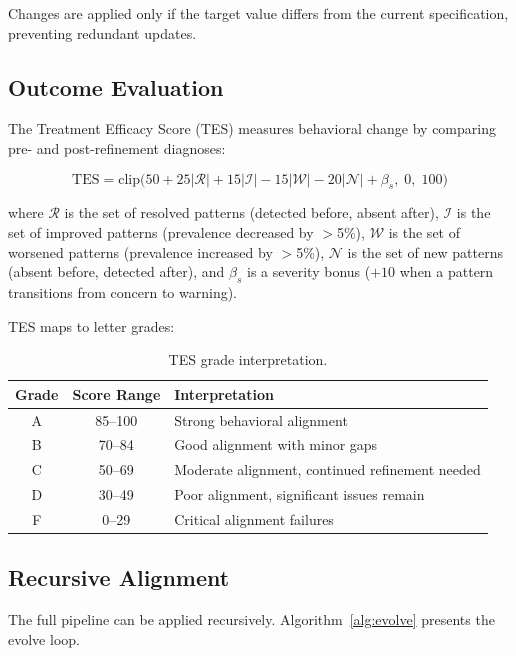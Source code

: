 \documentclass[11pt,a4paper]{article}
\begin{document}
Changes are applied only if the target value differs from the current specification, preventing redundant updates.

\subsection{Outcome Evaluation}

The Treatment Efficacy Score (TES) measures behavioral change by comparing pre- and post-refinement diagnoses:

\begin{equation}
\text{TES} = \text{clip}\Big(50 + 25|\mathcal{R}| + 15|\mathcal{I}| - 15|\mathcal{W}| - 20|\mathcal{N}| + \beta_s, \; 0, \; 100\Big)
\label{eq:tes}
\end{equation}

\noindent where $\mathcal{R}$ is the set of resolved patterns (detected before, absent after), $\mathcal{I}$ is the set of improved patterns (prevalence decreased by $>$5\%), $\mathcal{W}$ is the set of worsened patterns (prevalence increased by $>$5\%), $\mathcal{N}$ is the set of new patterns (absent before, detected after), and $\beta_s$ is a severity bonus ($+10$ when a pattern transitions from concern to warning).

TES maps to letter grades:

\begin{table}[h]
\centering
\caption{TES grade interpretation.}
\label{tab:grades}
\begin{tabular}{@{}ccp{6cm}@{}}
\toprule
\textbf{Grade} & \textbf{Score Range} & \textbf{Interpretation} \\
\midrule
A & 85--100 & Strong behavioral alignment \\
B & 70--84 & Good alignment with minor gaps \\
C & 50--69 & Moderate alignment, continued refinement needed \\
D & 30--49 & Poor alignment, significant issues remain \\
F & 0--29 & Critical alignment failures \\
\bottomrule
\end{tabular}
\end{table}

\subsection{Recursive Alignment}

The full pipeline can be applied recursively. Algorithm~\ref{alg:evolve} presents the evolve loop.
\end{document}
